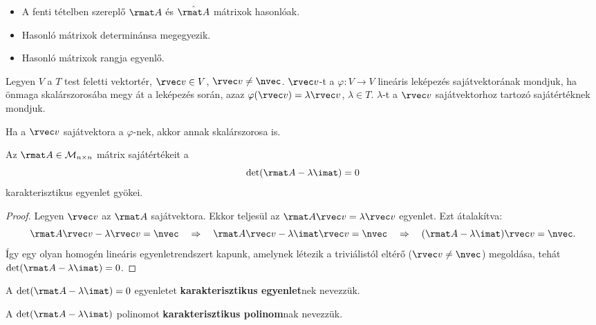 \begin{note}
  \begin{itemize}
    \item  A fenti tételben szereplő $\rmat A$ és $\hat{\rmat A}$ mátrixok
          hasonlóak.

    \item Hasonló mátrixok determinánsa megegyezik.

    \item Hasonló mátrixok rangja egyenlő.
  \end{itemize}
\end{note}

\begin{definition}
  Legyen $V$ a $T$ test feletti vektortér, $\rvec v \in V$, $\rvec v \neq
    \nvec$. $\rvec v$-t a $\varphi: V \rightarrow V$ lineáris leképezés
  sajátvektorának mondjuk, ha önmaga skalárszorosába megy át a leképezés
  során, azaz $\varphi(\rvec v) = \lambda \rvec v$,  $\lambda \in T$.
  $\lambda$-t a $\rvec v$ sajátvektorhoz tartozó sajátértéknek mondjuk.
\end{definition}

\begin{note}
  Ha a $\rvec v$ sajátvektora a $\varphi$-nek, akkor annak skalárszorosa is.
\end{note}

\begin{theorem}
  Az $\rmat A \in \mathcal M_{n \times n}$ mátrix sajátértékeit a
  $$
    \det(\rmat A - \lambda \imat) = 0
  $$
  karakterisztikus egyenlet gyökei.

  \begin{proof}
    Legyen $\rvec v$ az $\rmat A$ sajátvektora. Ekkor teljesül az
    $\rmat A \rvec v = \lambda \rvec v$ egyenlet. Ezt átalakítva:
    $$
      \rmat A \rvec v - \lambda \rvec v = \nvec
      \quad \Rightarrow \quad
      \rmat A \rvec v - \lambda \imat \rvec v = \nvec
      \quad \Rightarrow \quad
      (\rmat A - \lambda \imat) \rvec v = \nvec
      \text.
    $$
    Így egy olyan homogén lineáris egyenletrendszert kapunk, amelynek létezik
    a triviálistól eltérő ($\rvec v \neq \nvec$) megoldása, tehát
    $\det(\rmat A - \lambda \imat) = 0$.
  \end{proof}
\end{theorem}

\begin{note}
  A $\det(\rmat A - \lambda \imat) = 0$ egyenletet \textbf{karakterisztikus
    egyenlet}nek nevezzük.

  A $\det(\rmat A - \lambda \imat)$ polinomot \textbf{karakterisztikus
    polinom}nak nevezzük.
\end{note}

